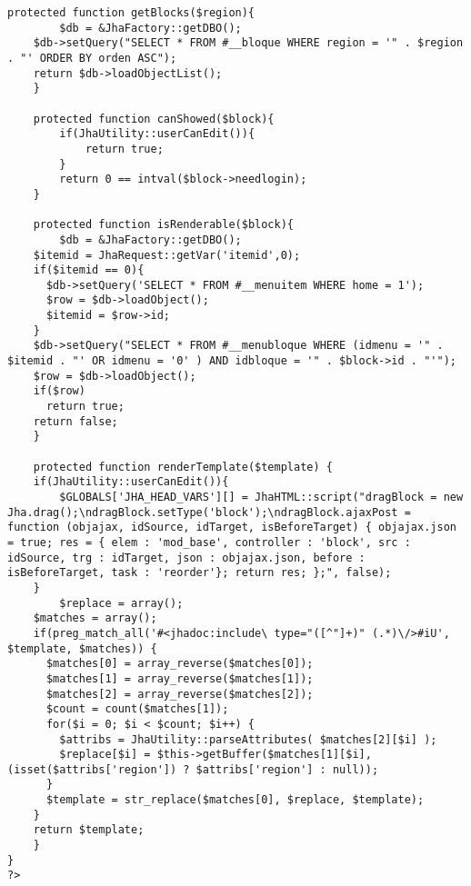 \begin{lstlisting}[label=jha_renderer,caption=Renderizador JhaRenderer.]
	protected function getBlocks($region){
		$db = &JhaFactory::getDBO();
    $db->setQuery("SELECT * FROM #__bloque WHERE region = '" . $region . "' ORDER BY orden ASC");
    return $db->loadObjectList();
	}
	
	protected function canShowed($block){
		if(JhaUtility::userCanEdit()){
			return true;
		}
		return 0 == intval($block->needlogin);
	}
	
	protected function isRenderable($block){
		$db = &JhaFactory::getDBO();
    $itemid = JhaRequest::getVar('itemid',0);
    if($itemid == 0){
      $db->setQuery('SELECT * FROM #__menuitem WHERE home = 1');
      $row = $db->loadObject();
      $itemid = $row->id;
    }
    $db->setQuery("SELECT * FROM #__menubloque WHERE (idmenu = '" . $itemid . "' OR idmenu = '0' ) AND idbloque = '" . $block->id . "'");
    $row = $db->loadObject();
    if($row)
      return true;
    return false;
	}
	
	protected function renderTemplate($template) {
    if(JhaUtility::userCanEdit()){
    	$GLOBALS['JHA_HEAD_VARS'][] = JhaHTML::script("dragBlock = new Jha.drag();\ndragBlock.setType('block');\ndragBlock.ajaxPost = function (objajax, idSource, idTarget, isBeforeTarget) { objajax.json = true; res = { elem : 'mod_base', controller : 'block', src : idSource, trg : idTarget, json : objajax.json, before : isBeforeTarget, task : 'reorder'}; return res; };", false);
    }
		$replace = array();
    $matches = array();
    if(preg_match_all('#<jhadoc:include\ type="([^"]+)" (.*)\/>#iU', $template, $matches)) {
      $matches[0] = array_reverse($matches[0]);
      $matches[1] = array_reverse($matches[1]);
      $matches[2] = array_reverse($matches[2]);
      $count = count($matches[1]);
      for($i = 0; $i < $count; $i++) {
        $attribs = JhaUtility::parseAttributes( $matches[2][$i] );
        $replace[$i] = $this->getBuffer($matches[1][$i], (isset($attribs['region']) ? $attribs['region'] : null));
      }
      $template = str_replace($matches[0], $replace, $template);
    }
    return $template;
	} 
}
?>
\end{lstlisting}
